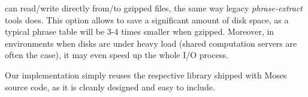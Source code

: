 \Eppex{} can read/write directly from/to gzipped files, the same way legacy \emph{phrase-extract}
tools does.
This option allows to save a significant amount of disk space, as a typical phrase table will be
3-4 times smaller when gzipped. %
Moreover, in environments when disks are under heavy load (shared computation servers are often
the case), it may even speed up the whole I/O process.

Our implementation simply reuses the respective library shipped with Moses source code,
as it is cleanly designed and easy to include.

